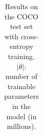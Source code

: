 \documentclass[10pt,twocolumn,letterpaper]{article}
\newcommand{\model}{\textsc{SmallCap}\xspace}
\begin{document}
\begin{table}[]
{\begin{tabular}{llllll}
    \bottomrule
    \end{tabular}
    }
    \caption{Results on the COCO test set with cross-entropy training. 
    $|\theta|$: number of trainable parameters in the model (in millions).%
    }
    \label{tab:main_results}
\end{table}

        
\end{document}
